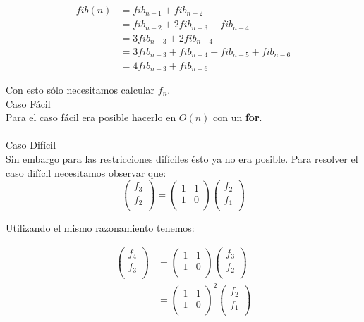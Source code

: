 \documentclass[12pt]{article}
\begin{document}
\begin{align*}
fib(n) & = fib_{n-1} + fib_{n-2} \\
       & = fib_{n-2} + 2fib_{n-3} + fib_{n-4} \\
       & = 3fib_{n-3} + 2fib_{n-4} \\
       & = 3fib_{n-3} + fib_{n-4} + fib_{n-5} + fib_{n-6} \\
       & = 4fib_{n-3} + fib_{n-6}
\end{align*} 

Con esto sólo necesitamos calcular $f_n$. 
\\
\textrm{\large Caso Fácil}\\
Para el caso fácil era posible hacerlo en $O(n)$ con un \textbf{for}.\\
\\
\textrm{\large Caso Difícil}\\
Sin embargo para las restricciones difíciles ésto ya no era posible. Para resolver el caso difícil necesitamos observar que:\\
$$
 \begin{pmatrix}
  f_3 \\
  f_2 \\
 \end{pmatrix}
 =
 \begin{pmatrix}
  1 & 1 \\
  1 & 0 \\
 \end{pmatrix}
 \begin{pmatrix}
  f_2 \\
  f_1 \\
 \end{pmatrix}
$$

Utilizando el mismo razonamiento tenemos:

 \begin{align*}
 \begin{pmatrix}
  f_4 \\
  f_3 \\
 \end{pmatrix} 
 & =
 \begin{pmatrix}
  1 & 1 \\
  1 & 0 \\
 \end{pmatrix}
 \begin{pmatrix}
  f_3 \\
  f_2 \\
 \end{pmatrix} \\
 & =
 \begin{pmatrix}
  1 & 1 \\
  1 & 0 \\
 \end{pmatrix}^2
 \begin{pmatrix}
  f_2 \\
  f_1 \\
 \end{pmatrix} 
\end{align*}
\end{document}
